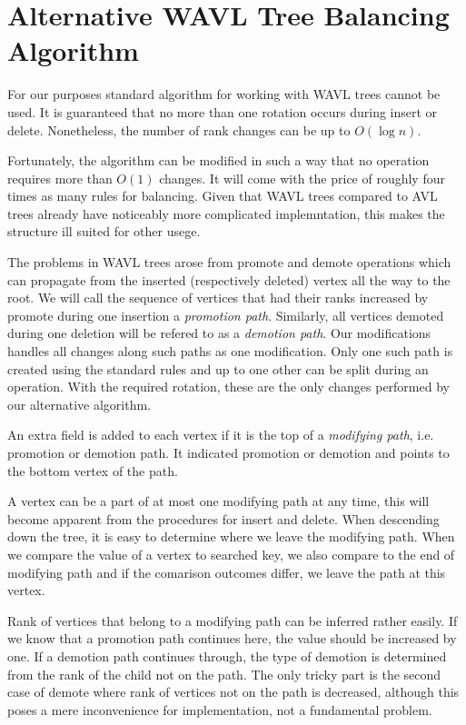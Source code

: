 \section{Alternative WAVL Tree Balancing Algorithm}

For our purposes standard algorithm for working with WAVL trees cannot be used. It is guaranteed that no more than one rotation occurs during insert or delete. Nonetheless, the number of rank changes can be up to $O(\log n)$. 

Fortunately, the algorithm can be modified in such a way that no operation requires more than $O(1)$ changes. It will come with the price of roughly four times as many rules for balancing. Given that WAVL trees compared to AVL trees already have noticeably more complicated implemntation, this makes the structure ill suited for other usege. 

The problems in WAVL trees arose from promote and demote operations which can propagate from the inserted (respectively deleted) vertex all the way to the root. We will call the sequence of vertices that had their ranks increased by promote during one insertion a {\em promotion path}. Similarly, all vertices demoted during one deletion will be refered to as a {\em demotion path}. Our modifications handles all changes along such paths as one modification. Only one such path is created using the standard rules and up to one other can be split during an operation. With the required rotation, these are the only changes performed by our alternative algorithm.


An extra field is added to each vertex if it is the top of a {\em modifying path}, i.e. promotion or demotion path. It indicated promotion or demotion and points to the bottom vertex of the path.

A vertex can be a part of at most one modifying path at any time, this will become apparent from the procedures for insert and delete. When descending down the tree, it is easy to determine where we leave the modifying path. When we compare the value of a vertex to searched key, we also compare to the end of modifying path and if the comarison outcomes differ, we leave the path at this vertex. 

Rank of vertices that belong to a modifying path can be inferred rather easily. If we know that a promotion path continues here, the value should be increased by one. If a demotion path continues through, the type of demotion is determined from the rank of the child not on the path. The only tricky part is the second case of demote where rank of vertices not on the path is decreased, although this poses a mere inconvenience for implementation, not a fundamental problem.

